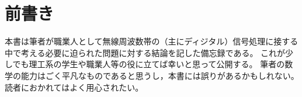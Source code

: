 \part{前書き}
    本書は筆者が職業人として無線周波数帯の（主にディジタル）信号処理に接する中で考える必要に迫られた問題に対する結論を記した備忘録である。
    これが少しでも理工系の学生や職業人等の役に立てば幸いと思って公開する。
    筆者の数学の能力はごく平凡なものであると思うし，本書には誤りがあるかもしれない。
    読者におかれてはよく用心されたい。

